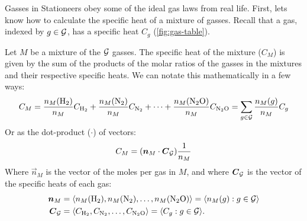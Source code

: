 \documentclass{article}
\newcommand{\Hyd}{\mathrm{H}_2}
\newcommand{\Nit}{\mathrm{N}_2}
\newcommand{\NiOx}{\mathrm{N}_2\mathrm{O}}
\begin{document}
Gasses in Stationeers obey some of the ideal gas laws from real life.
First, lets know how to calculate the specific heat of a mixture of gasses.
Recall that a gas, indexed by $g\in\operatorname{{\mathcal{G}}}$, has a specific heat $C_g$ (\cref{fig:gas-table}).
\begin{definition}
    Let $M$ be a mixture of the $\operatorname{{\mathcal{G}}}$ gasses. The specific heat of the mixture ($C_M$) is given by
    the sum of the products of the molar ratios of the gasses in the mixtures and their respective
    specific heats. We can notate this mathematically in a few ways:
    \[
        C_M
        = \frac{n_M(\Hyd)}{n_M}C_{\Hyd}
        + \frac{n_M(\Nit)}{n_M}C_{\Nit}
        + \cdots
        + \frac{n_M(\NiOx)}{n_M}C_{\NiOx}
        = \sum_{g\in\calG} \frac{n_M(g)}{n_M}C_g
    \]
    Or as the dot-product ($\cdot$) of vectors:
    \begin{equation}
        C_M = (\boldsymbol{n}_M \cdot \boldsymbol{C}_{\operatorname{{\mathcal{G}}}})\frac{1}{n_M}
    \end{equation}
    Where $\vec{n}_M$ is the vector of the moles per gas in $M$, and
    where $\boldsymbol{C}_{\operatorname{{\mathcal{G}}}}$ is the vector of the specific heats of each gas:
    \begin{align*}
        \vec{n}_M
        &= \angvec{n_M(\Hyd),n_M(\Nit),\ldots,n_M(\NiOx)}
        = \angvec{n_M(g):g\in\calG} \\
        \vec{C}_{\calG}
        &= \angvec{C_{\Hyd},C_{\Nit},\ldots,C_{\NiOx}}
        = \angvec{C_g:g\in\calG}.
    \end{align*}
\end{definition}
\end{document}
